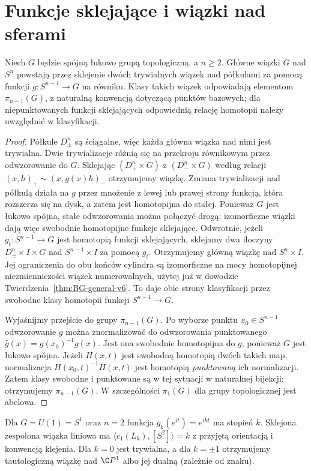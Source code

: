 \section{Funkcje sklejające i wiązki nad sferami}
\begin{twierdzenie}
Niech $G$ będzie spójną łukowo grupą topologiczną,
a $n\ge2$. Główne wiązki $G$ nad $S^n$ powstają
przez sklejenie dwóch trywialnych wiązek nad
półkulami za pomocą funkcji
$g:S^{n-1}\to G$ na równiku. Klasy takich wiązek
odpowiadają elementom $\pi_{n-1}(G)$, z naturalną
konwencją dotyczącą punktów bazowych; dla niepunktowanych
funkcji sklejających odpowiednią relację homotopii
należy uwzględnić w klasyfikacji.
\end{twierdzenie}
\begin{proof}
Półkule $D^n_\pm$ są ściągalne, więc każda główna wiązka
nad nimi jest trywialna. Dwie trywializacje różnią się
na przekroju równikowym przez odwzorowanie do $G$.
Sklejając $(D^n_+\times G)$ z $(D^n_-\times G)$
według relacji $(x,h)_+\sim(x,g(x)h)_-$ otrzymujemy
wiązkę. Zmiana trywializacji nad półkulą działa na
$g$ przez mnożenie z lewej lub prawej strony funkcją,
która rozszerza się na dysk, a zatem jest homotopijna
do stałej. Ponieważ $G$ jest łukowo spójna,
stałe odwzorowania można połączyć drogą; izomorficzne
wiązki dają więc swobodnie homotopijne funkcje
sklejające. Odwrotnie, jeżeli $g_t:S^{n-1}\to G$
jest homotopią funkcji sklejających, sklejamy
dwa iloczyny $D^n_\pm\times I\times G$ nad
$S^{n-1}\times I$ za pomocą $g_t$.
Otrzymujemy główną wiązkę nad $S^n\times I$.
Jej ograniczenia do obu końców cylindra są
izomorficzne na mocy homotopijnej niezmienniczości
wiązek numerowalnych, użytej już w dowodzie
Twierdzenia~\ref{thm:BG-general-v6}.
To daje obie strony klasyfikacji przez swobodne
klasy homotopii funkcji $S^{n-1}\to G$.

Wyjaśnijmy przejście do grupy $\pi_{n-1}(G)$.
Po wyborze punktu $x_0\in S^{n-1}$ odwzorowanie
$g$ można znormalizować do odwzorowania punktowanego
$\widehat g(x)=g(x_0)^{-1}g(x)$.
Jest ona swobodnie homotopijna do $g$, ponieważ
$G$ jest łukowo spójna. Jeżeli $H(x,t)$
jest swobodną homotopią dwóch takich map,
normalizacja
$H(x_0,t)^{-1}H(x,t)$
jest homotopią \emph{punktowaną} ich normalizacji.
Zatem klasy swobodne i punktowane są w tej
sytuacji w naturalnej bijekcji; otrzymujemy
$\pi_{n-1}(G)$. W szczególności
$\pi_1(G)$ dla grupy topologicznej jest abelowa.
\end{proof}
\begin{przyklad}
Dla $G=U(1)=S^1$ oraz $n=2$ funkcja
$g_k(e^{it})=e^{ikt}$ ma stopień $k$.
Sklejona zespolona wiązka liniowa ma
$\langle c_1(L_k),[S^2]\rangle=k$ z przyjętą
orientacją i konwencją klejenia. Dla $k=0$ jest trywialna,
a dla $k=\pm1$ otrzymujemy tautologiczną wiązkę
nad $\C P^1$ albo jej dualną (zależnie od znaku).
\end{przyklad}


